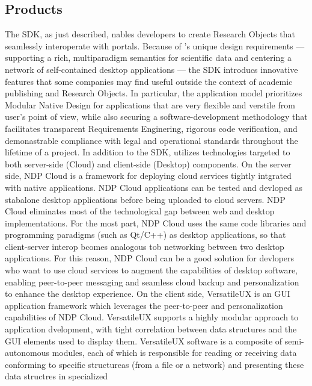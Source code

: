 \documentclass[11pt,letterpaper]{article}
\begin{document}
\subsection{{\lMOSAIC} Products}
The {\MOSAIC} SDK, as just described, nables 
developers to create Research Objects that 
seamlessly interoperate with {\MOSAIC} 
portals.  Because of {\MOSAIC}'s unique design 
requirements --- supporting a 
rich, multiparadigm semantics for scientific data 
and centering a network of self-contained 
desktop applications --- the {\MOSAIC} SDK 
introducs innovative features that some companies may 
find useful outside the context of academic 
publishing and Research Objects.  
In particular, the {\MOSAIC} application model 
prioritizes Modular Native Design for applications 
that are very flexible and verstile 
from user's point of view, 
while also securing a software-development methodology 
that facilitates transparent Requirements 
Enginering, rigorous code verification, 
and demonastrable compliance with 
legal and operational standards throughout the 
lifetime of a project.
\p{}
In addition to the SDK, {\MOSAIC} utilizes technologies 
targeted to both server-side (Cloud) 
and client-side (Desktop) components.  On the 
server side, NDP Cloud is a framework for deploying 
cloud services tightly intgrated with native applications.  
NDP Cloud applications can be tested and 
devloped as stabalone desktop applications before 
being uploaded to cloud servers.  
NDP Cloud eliminates most of the technological 
gap between web and desktop implementations.  
For the most part, NDP Cloud uses the same code libraries 
and programming paradigms (such as Qt/C++) as 
desktop applications, so that client-server interop 
bcomes analogous tob networking between two 
desktop applications.  For this reason, NDP Cloud 
can be a good solution for devlopers who want to 
use cloud services to augment the capabilities 
of desktop software, enabling peer-to-peer 
messaging and seamless cloud backup and 
personalization to enhance the desktop experience.
\p{}
On the client side, VersatileUX is an GUI 
application framework which leverages 
the peer-to-peer and personalization 
capabilities of NDP Cloud.  VersatileUX 
supports a highly modular approach to 
application dvelopment, with tight 
correlation between data structures and the GUI 
elements used to display them.  VersatileUX 
software is a composite of semi-autonomous  
modules, each of which is responsible for 
reading or receiving data conforming 
to specific structureas (from a file or a network) 
and presenting these data structres in specialized 
\end{document}
